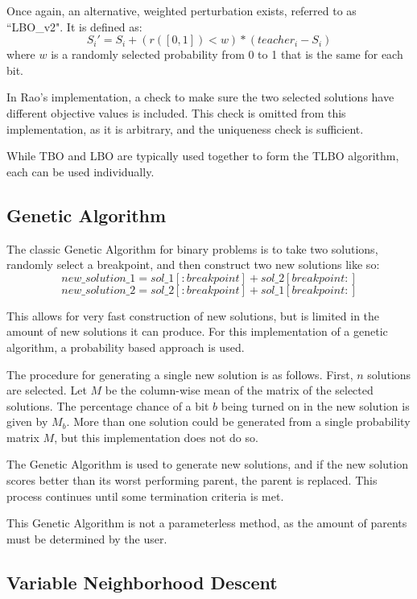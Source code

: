 \documentclass[11pt, letterpaper, onecolumn]{article}
\begin{document}
Once again, an alternative, weighted perturbation exists, referred to as ``LBO\_v2". It is defined as:
\begin{equation}
S_i' = S_i + (r([0,1])<w)*(teacher_i - S_i)
\end{equation}
where $w$ is a randomly selected probability from 0 to 1 that is the same for each bit. 

In Rao's implementation, a check to make sure the two selected solutions have different objective values is included. This check is omitted from this implementation, as it is arbitrary, and the uniqueness check is sufficient. 

While TBO and LBO are typically used together to form the TLBO algorithm, each can be used individually. 

\subsection{Genetic Algorithm}

The classic Genetic Algorithm for binary problems is to take two solutions, randomly select a breakpoint, and then construct two new solutions like so:
\begin{equation}
new\_solution\_1 = sol\_1[:breakpoint] + sol\_2[breakpoint:]
\end{equation}
$$ new\_solution\_2 = sol\_2[:breakpoint] + sol\_1[breakpoint:] $$

This allows for very fast construction of new solutions, but is limited in the amount of new solutions it can produce. For this implementation of a genetic algorithm, a probability based approach is used. 

The procedure for generating a single new solution is as follows. First, $n$ solutions are selected. Let $M$ be the column-wise mean of the matrix of the selected solutions. The percentage chance of a bit $b$ being turned on in the new solution is given by $M_b$. More than one solution could be generated from a single probability matrix $M$, but this implementation does not do so. 

The Genetic Algorithm is used to generate new solutions, and if the new solution scores better than its worst performing parent, the parent is replaced. This process continues until some termination criteria is met. 

This Genetic Algorithm is not a parameterless method, as the amount of parents must be determined by the user.

\subsection{Variable Neighborhood Descent}
\end{document}
